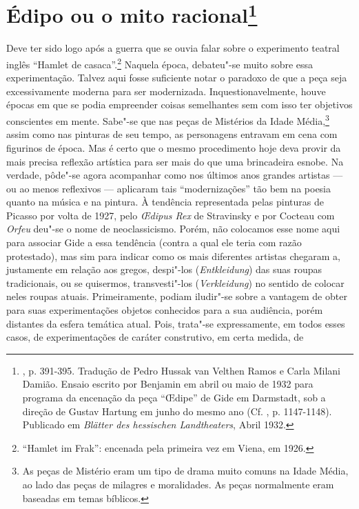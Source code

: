 \chapter{Édipo ou o mito racional\footnote[*]{, p. 391-395. Tradução de
  Pedro Hussak van Velthen Ramos e Carla Milani Damião. Ensaio escrito
  por Benjamin em abril ou maio de 1932 para programa da encenação da
  peça ``\OE dipe'' de Gide em Darmstadt, sob a direção de Gustav Hartung
  em junho do mesmo ano (Cf. , p. 1147-1148). Publicado em
  \emph{Blätter des hessischen Landtheaters}, Abril 1932.}}

Deve ter sido logo após a guerra que se ouvia falar sobre o experimento
teatral inglês ``Hamlet de casaca''.\footnote{``Hamlet im Frak'':
  encenada pela primeira vez em Viena, em 1926. \versal{[N. E.]}} Naquela época,
debateu"-se muito sobre essa experimentação. Talvez aqui fosse suficiente
notar o paradoxo de que a peça seja excessivamente moderna para ser
modernizada. Inquestionavelmente, houve épocas em que se podia
empreender coisas semelhantes sem com isso ter objetivos conscientes em mente.
Sabe"-se que nas peças de Mistérios da Idade Média,\footnote{As peças de Mistério eram um tipo de drama muito comuns na Idade Média, ao lado das peças de milagres e moralidades. As peças normalmente eram baseadas em temas bíblicos.} assim como nas %
pinturas de seu tempo, as personagens entravam em cena com figurinos de
época. Mas é certo que o mesmo procedimento hoje deva provir da mais
precisa reflexão artística para ser mais do que uma brincadeira esnobe.
Na verdade, pôde"-se agora acompanhar como nos últimos anos grandes
artistas --- ou ao menos reflexivos --- aplicaram tais ``modernizações''
tão bem na poesia quanto na música e na pintura. À tendência
representada pelas pinturas de Picasso por volta de 1927, pelo
\emph{\OE dipus Rex} de Stravinsky e por Cocteau com \emph{Orfeu} deu"-se o
nome de neoclassicismo. Porém, não colocamos esse nome aqui para
associar Gide a essa tendência (contra a qual ele teria com razão
protestado), mas sim para indicar como os mais diferentes artistas
chegaram a, justamente em relação aos gregos, despi"-los
(\emph{Entkleidung}) das suas roupas tradicionais, ou se quisermos, transvesti"-los (\emph{Verkleidung}) no sentido de colocar neles roupas atuais.
Primeiramente, podiam iludir"-se sobre a vantagem de
obter para suas experimentações objetos conhecidos para a sua audiência, porém distantes da
esfera temática atual. Pois, trata"-se expressamente, em todos esses
casos, de experimentações de caráter construtivo, em certa medida, de
